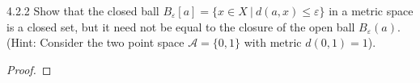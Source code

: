 \begin{problem}{4.2.2}
  Show that the closed ball $B_\varepsilon[a] = \{x \in X \ |\ d(a, x) \leq \varepsilon\}$
  in a metric space is a closed set, but it need not be equal to the closure
  of the open ball $B_\varepsilon(a)$. (Hint: Consider the two point space $\mathcal{A}= \{0, 1\}$ with metric $d(0, 1) = 1$).
\end{problem}

\begin{proof}
\end{proof}
\newpage

